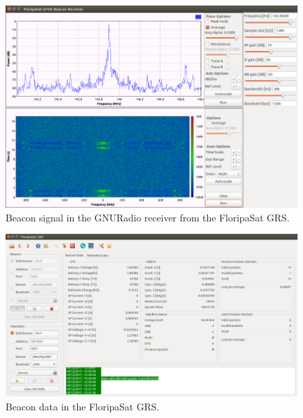 \begin{figure}[!h]
	\begin{center}
		\includegraphics[width=\textwidth]{figures/beacon-signal-gnuradio.png}
		\caption{Beacon signal in the GNURadio receiver from the FloripaSat GRS.}
		\label{fig:beacon-signal-gnuradio}
	\end{center}
\end{figure}

\begin{figure}[!h]
	\begin{center}
		\includegraphics[width=\textwidth]{figures/beacon-data-grs.png}
		\caption{Beacon data in the FloripaSat GRS.}
		\label{fig:beacon-data-grs}
	\end{center}
\end{figure}
